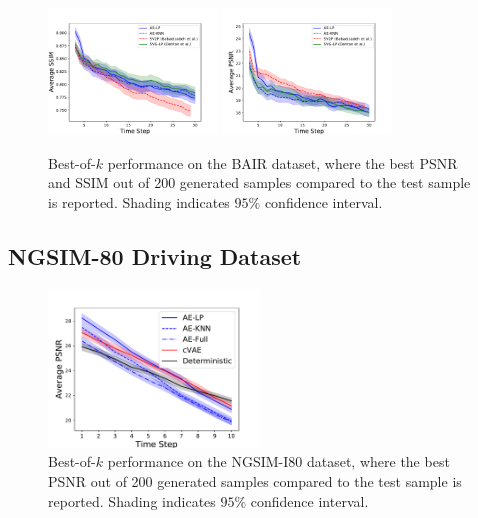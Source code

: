 \documentclass{article}
\begin{document}
\begin{figure}
  \centering
  \includegraphics[width=0.4\textwidth]{images/bair_ssim.pdf}
  \includegraphics[width=0.4\textwidth]{images/bair_psnr.pdf}
  \caption{Best-of-$k$ performance on the BAIR dataset, where the best PSNR and SSIM out of 200 generated samples compared to the test sample is reported. Shading indicates $95\%$ confidence interval. }
  \label{bair}
\end{figure}


\subsection{NGSIM-80 Driving Dataset}


\begin{figure}
  \centering
  \includegraphics[width=0.5\textwidth]{images/best_of_k_i80.pdf}
  \caption{Best-of-$k$ performance on the NGSIM-I80 dataset, where the best PSNR out of 200 generated samples compared to the test sample is reported. Shading indicates $95\%$ confidence interval. }
  \label{bair}
\end{figure}
\end{document}
